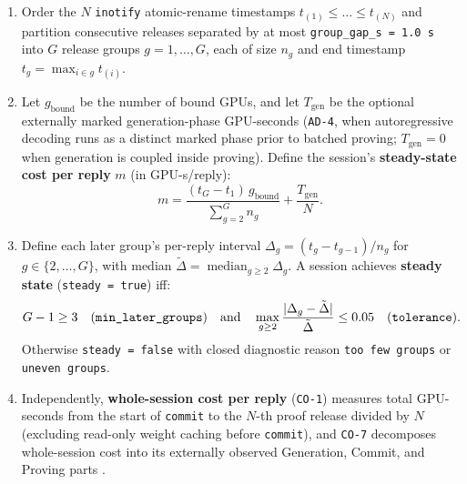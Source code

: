 \documentclass[11pt,letterpaper]{article}
\begin{document}
\begin{enumerate}
\item Order the $N$ \texttt{inotify} atomic-rename timestamps $t_{(1)} \le \dots \le t_{(N)}$ and partition consecutive releases separated by at most \texttt{group\_\allowbreak{}gap\_\allowbreak{}s = 1.0 s} into $G$ release groups $g = 1, \dots, G$, each of size $n_g$ and end timestamp $t_g = \max_{i \in g} t_{(i)}$.
\item Let $g_{\text{bound}}$ be the number of bound GPUs, and let $T_{\text{gen}}$ be the optional externally marked generation-phase GPU-seconds (\texttt{AD-4}, when autoregressive decoding runs as a distinct marked phase prior to batched proving; $T_{\text{gen}} = 0$ when generation is coupled inside proving). Define the session's \textbf{steady-state cost per reply} $m$ (in GPU-s/reply):
\[
m = \frac{(t_G - t_1)\, g_{\text{bound}}}{\sum_{g=2}^{G} n_g} + \frac{T_{\text{gen}}}{N}.
\]
\item Define each later group's per-reply interval $\Delta_g = (t_g - t_{g-1}) / n_g$ for $g \in \{2, \dots, G\}$, with median $\tilde{\Delta} = \operatorname{median}_{g \ge 2} \Delta_g$. A session achieves \textbf{steady state} (\texttt{steady = true}) iff:
\[
G - 1 \ge 3 \quad (\text{\texttt{min\_later\_groups}}) \quad \text{and} \quad \max_{g \ge 2} \frac{|\Delta_g - \tilde{\Delta}|}{\tilde{\Delta}} \le 0.05 \quad (\text{\texttt{tolerance}}).
\] Otherwise \texttt{steady = false} with closed diagnostic reason \texttt{too few groups} or \texttt{uneven groups}.
\item Independently, \textbf{whole-session cost per reply} (\texttt{CO-1}) measures total GPU-seconds from the start of \texttt{commit} to the $N$-th proof release divided by $N$ (excluding read-only weight caching before \texttt{commit}), and \texttt{CO-7} decomposes whole-session cost into its externally observed Generation, Commit, and Proving parts \cite{iproofs2026}.
\end{enumerate}
\end{document}
